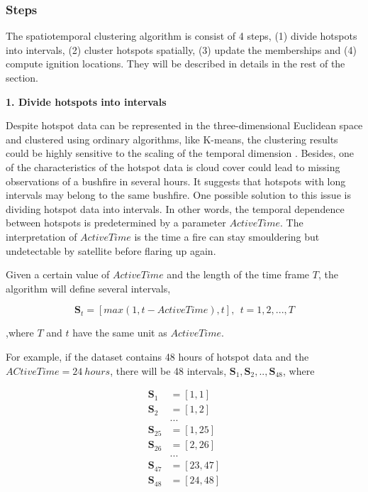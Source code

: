 \hypertarget{steps}{%
\subsubsection{Steps}\label{steps}}

The spatiotemporal clustering algorithm is consist of 4 steps, (1)
divide hotspots into intervals, (2) cluster hotspots spatially, (3)
update the memberships and (4) compute ignition locations. They will be
described in details in the rest of the section.

\textbf{1. Divide hotspots into intervals}

Despite hotspot data can be represented in the three-dimensional
Euclidean space and clustered using ordinary algorithms, like K-means,
the clustering results could be highly sensitive to the scaling of the
temporal dimension \citep{kisilevich2009spatio}. Besides, one of the
characteristics of the hotspot data is cloud cover could lead to missing
observations of a bushfire in several hours. It suggests that hotspots
with long intervals may belong to the same bushfire. One possible
solution to this issue is dividing hotspot data into intervals. In other
words, the temporal dependence between hotspots is predetermined by a
parameter \(ActiveTime\). The interpretation of \(ActiveTime\) is the
time a fire can stay smouldering but undetectable by satellite before
flaring up again.

Given a certain value of \(ActiveTime\) and the length of the time frame
\(T\), the algorithm will define several intervals,

\[\boldsymbol{S}_t = [max(1,t-ActiveTime),t],~~t = 1,2,...,T\]

,where \(T\) and \(t\) have the same unit as \(ActiveTime\).

For example, if the dataset contains 48 hours of hotspot data and the
\(ACtiveTime = 24~hours\), there will be 48 intervals,
\(\boldsymbol{S}_1,\boldsymbol{S}_2,..,\boldsymbol{S}_{48}\), where

\begin{align*}
\boldsymbol{S}_1 &= [1,1]\\
\boldsymbol{S}_2 &= [1,2]\\
&...\\
\boldsymbol{S}_{25} &= [1,25]\\
\boldsymbol{S}_{26} &= [2,26]\\
&...\\
\boldsymbol{S}_{47} &= [23,47]\\
\boldsymbol{S}_{48} &= [24,48]
\end{align*}

